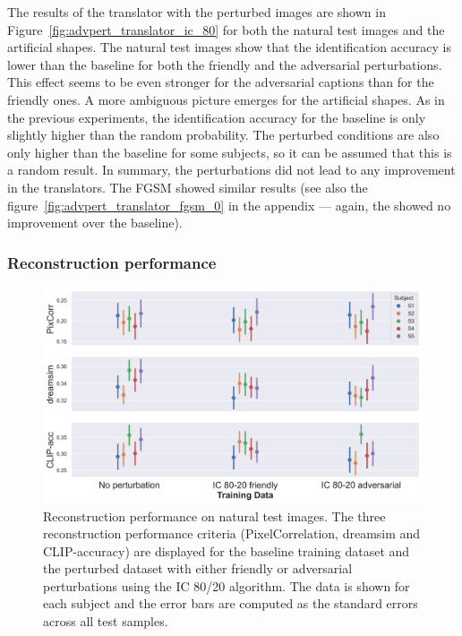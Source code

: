 The results of the translator with the perturbed images are shown in Figure~\ref{fig:advpert_translator_ic_80} for both the natural test images and the artificial shapes. The natural test images show that the identification accuracy is lower than the baseline for both the friendly and the adversarial perturbations. This effect seems to be even stronger for the adversarial captions than for the friendly ones. A more ambiguous picture emerges for the artificial shapes. As in the previous experiments, the identification accuracy for the baseline is only slightly higher than the random probability. The perturbed conditions are also only higher than the baseline for some subjects, so it can be assumed that this is a random result. In summary, the perturbations did not lead to any improvement in the translators. The FGSM showed similar results (see also the figure~\ref{fig:advpert_translator_fgsm_0} in the appendix --- again, the  showed no improvement over the baseline). 


\subsubsection{Reconstruction performance}

\begin{figure}[ht]
    \centering
    \includegraphics[width=1\textwidth]{plots/advpert_reconstruction_test_ic_80-20.png}
    \caption[Experiment 3: Reconstruction performance on natural test images]{Reconstruction performance on natural test images. The three reconstruction performance criteria (PixelCorrelation, dreamsim and CLIP-accuracy) are displayed for the baseline training dataset and the perturbed dataset with either friendly or adversarial perturbations using the IC 80/20 algorithm. The data is shown for each subject and the error bars are computed as the standard errors across all test samples.}\label{fig:advpert_reconstruction_test_ic_80}
\end{figure}

